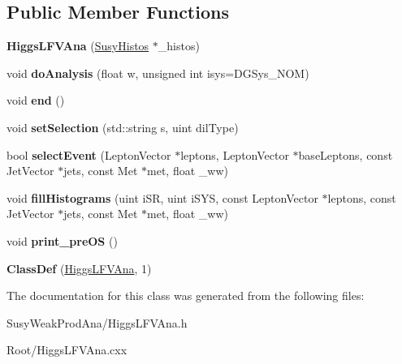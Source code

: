 \subsection*{Public Member Functions}
\begin{DoxyCompactItemize}
\item 
\hypertarget{classHiggsLFVAna_a17ede476b7dc2a03c3410c150898c4fa}{
{\bfseries HiggsLFVAna} (\hyperlink{classSusyHistos}{SusyHistos} $\ast$\_\-histos)}
\label{classHiggsLFVAna_a17ede476b7dc2a03c3410c150898c4fa}

\item 
\hypertarget{classHiggsLFVAna_aebdcf3d3fb65aad52279032c6b047e9d}{
void {\bfseries doAnalysis} (float w, unsigned int isys=DGSys\_\-NOM)}
\label{classHiggsLFVAna_aebdcf3d3fb65aad52279032c6b047e9d}

\item 
\hypertarget{classHiggsLFVAna_ab7a299a9b82fa5878efbb6c997d7cc15}{
void {\bfseries end} ()}
\label{classHiggsLFVAna_ab7a299a9b82fa5878efbb6c997d7cc15}

\item 
\hypertarget{classHiggsLFVAna_a590f14d2f9894c48c7f35fcadac67e50}{
void {\bfseries setSelection} (std::string s, uint dilType)}
\label{classHiggsLFVAna_a590f14d2f9894c48c7f35fcadac67e50}

\item 
\hypertarget{classHiggsLFVAna_a641d564bb1c56939b023270f8fdd1c53}{
bool {\bfseries selectEvent} (LeptonVector $\ast$leptons, LeptonVector $\ast$baseLeptons, const JetVector $\ast$jets, const Met $\ast$met, float \_\-ww)}
\label{classHiggsLFVAna_a641d564bb1c56939b023270f8fdd1c53}

\item 
\hypertarget{classHiggsLFVAna_a80a6e0e77dcc10fdce1546b91a4d70a0}{
void {\bfseries fillHistograms} (uint iSR, uint iSYS, const LeptonVector $\ast$leptons, const JetVector $\ast$jets, const Met $\ast$met, float \_\-ww)}
\label{classHiggsLFVAna_a80a6e0e77dcc10fdce1546b91a4d70a0}

\item 
\hypertarget{classHiggsLFVAna_a4677b3064033c4d240ddc4fda48353ec}{
void {\bfseries print\_\-preOS} ()}
\label{classHiggsLFVAna_a4677b3064033c4d240ddc4fda48353ec}

\item 
\hypertarget{classHiggsLFVAna_ad29c474365cdd97419a55e68d9a55ec5}{
{\bfseries ClassDef} (\hyperlink{classHiggsLFVAna}{HiggsLFVAna}, 1)}
\label{classHiggsLFVAna_ad29c474365cdd97419a55e68d9a55ec5}

\end{DoxyCompactItemize}


The documentation for this class was generated from the following files:\begin{DoxyCompactItemize}
\item 
SusyWeakProdAna/HiggsLFVAna.h\item 
Root/HiggsLFVAna.cxx\end{DoxyCompactItemize}
